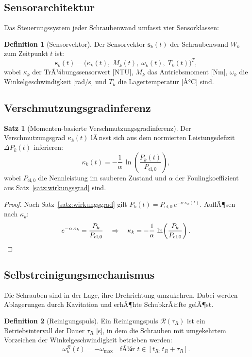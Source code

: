 ﻿\documentclass[a4paper,12pt]{article}
\theoremstyle{definition}
\newtheorem{definition}{Definition}
\newtheorem{satz}{Satz}
\begin{document}
\subsection{Sensorarchitektur}

Das Steuerungssystem jeder Schraubenwand umfasst vier Sensorklassen:

\begin{definition}[Sensorvektor]
Der Sensorvektor $\mathbf{s}_k(t)$ der Schraubenwand $W_k$ zum Zeitpunkt $t$ ist:
\[
  \mathbf{s}_k(t) = \bigl(\kappa_k(t),\; M_k(t),\; \omega_k(t),\; T_k(t)\bigr)^T,
\]
wobei $\kappa_k$ der TrÃ¼bungssensorwert [NTU], $M_k$ das Antriebsmoment [Nm],
$\omega_k$ die Winkelgeschwindigkeit [rad/s] und $T_k$ die Lagertemperatur [Â°C] sind.
\end{definition}

\subsection{Verschmutzungsgradinferenz}

\begin{satz}[Momenten-basierte Verschmutzungsgradinferenz]
\label{satz:infer}
Der Verschmutzungsgrad $\kappa_k(t)$ lÃ¤sst sich aus dem normierten Leistungsdefizit
$\Delta P_k(t)$ inferieren:
\[
  \kappa_k(t) = -\frac{1}{\alpha}\,\ln\!\left(\frac{P_k(t)}{P_{\mathrm{el},0}}\right),
\]
wobei $P_{\mathrm{el},0}$ die Nennleistung im sauberen Zustand und $\alpha$ der
Foulingkoeffizient aus Satz~\ref{satz:wirkungsgrad} sind.
\end{satz}

\begin{proof}
Nach Satz~\ref{satz:wirkungsgrad} gilt $P_k(t) = P_{\mathrm{el},0}\,e^{-\alpha\,\kappa_k(t)}$.
AuflÃ¶sen nach $\kappa_k$:
\[
  e^{-\alpha\,\kappa_k} = \frac{P_k}{P_{\mathrm{el},0}} \quad\Rightarrow\quad
  \kappa_k = -\frac{1}{\alpha}\,\ln\!\left(\frac{P_k}{P_{\mathrm{el},0}}\right). \qedhere
\]
\end{proof}

\subsection{Selbstreinigungsmechanismus}

Die Schrauben sind in der Lage, ihre Drehrichtung umzukehren. Dabei werden
Ablagerungen durch Kavitation und erhÃ¶hte SchubkrÃ¤fte gelÃ¶st.

\begin{definition}[Reinigungspuls]
Ein Reinigungspuls $\mathcal{R}(\tau_R)$ ist ein Betriebsintervall der Dauer
$\tau_R$ [s], in dem die Schrauben mit umgekehrtem Vorzeichen der Winkelgeschwindigkeit
betrieben werden:
\[
  \omega_k^{\mathcal{R}}(t) = -\omega_{\max}\quad\text{fÃ¼r } t \in [t_R, t_R + \tau_R].
\]
\end{definition}
\end{document}
